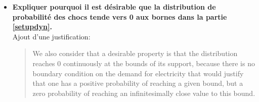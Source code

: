 \documentclass{article}
\newtheorem{proposition}[theorem]{Proposition}
\begin{document}
\begin{itemize}
\begin{quote}
\begin{proposition}
When $\gamma\to0$, with $\gamma>0$, the solution remains unique and converges towards the linear schedule available in KM's set of solutions, that is the same schedule selected with KM's selection rule obtained when considering an infinite support for the shocks.
\end{proposition}
\end{quote}

\item \textbf{Expliquer pourquoi il est désirable que la distribution de probabilité des chocs tende vers 0 aux bornes dans la partie \ref{setupdyn}.}\\

Ajout d'une justification:

\begin{quote}
We also consider that a desirable property is that the distribution reaches 0 continuously at the bounds of its support, because there is no boundary condition on the demand for electricity that would justify that one has a positive probability of reaching a given bound, but a zero probability of reaching an infinitesimally close value to this bound. 
\end{quote}

\end{itemize}
\end{document}
